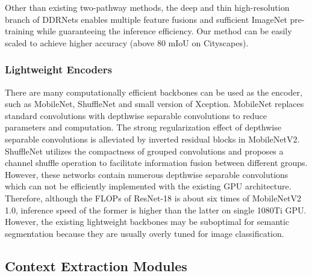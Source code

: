 \documentclass[journal]{IEEEtran}
\begin{document}
Other than existing two-pathway methods, the deep and thin high-resolution branch of DDRNets enables multiple feature fusions and sufficient ImageNet pre-training while guaranteeing the inference efficiency. Our method can be easily scaled to achieve higher accuracy (above 80 mIoU on Cityscapes). 

\subsubsection{Lightweight Encoders}

There are many computationally efficient backbones can be used as the encoder, such as MobileNet\cite{howard2017mobilenets}, ShuffleNet\cite{zhang2018shufflenet} and small version of Xception\cite{chollet2017xception}. MobileNet replaces standard convolutions with depthwise separable convolutions to reduce parameters and computation. The strong regularization effect of depthwise separable convolutions is alleviated by inverted residual blocks in MobileNetV2\cite{sandler2018mobilenetv2}. ShuffleNet utilizes the compactness of grouped convolutions and proposes a channel shuffle operation to facilitate information fusion between different groups. However, these networks contain numerous depthwise separable convolutions which can not be efficiently implemented with the existing GPU architecture. Therefore, although the FLOPs of ResNet-18\cite{he2016deep} is about six times of MobileNetV2 1.0, inference speed of the former is higher than the latter on single 1080Ti GPU\cite{orsic2019defense}. However, the existing lightweight backbones may be suboptimal for semantic segmentation because they are usually overly tuned for image classification.



\subsection{Context Extraction Modules}
\end{document}
